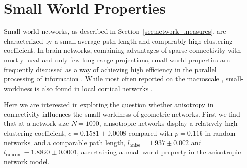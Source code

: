 

\section{Small World Properties}\label{sec:small_world}

Small-world networks, as described in
Section~\ref{sec:network_measures}, are characterized by a small
average path length and comparably high clustering coefficient. In
brain networks, combining advantages of sparse connectivity with
mostly local and only few long-range projections, small-world
properties are frequently discussed as a way of achieving high
efficiency in the parallel processing of
information \parencite[cf.][]{Achard2007}. While most often reported
on the macroscale \parencite{SpornsZwi2004, Bassett2006},
small-worldness is also found in local cortical
networks \parencite[SI]{Perin2011}.

Here we are interested in exploring the question whether
an\-iso\-tropy in connectivity influences the small-worldness of
geometric networks. First we find that at a network size $N=1000$,
anisotropic networks display a relatively high clustering coefficient,
$c = 0.1581 \pm 0.0008$ compared with $p = 0.116$ in random networks,
and a comparable path length, $l_{\mathrm{aniso}} = 1.937 \pm 0.002$
and $l_{\mathrm{random}} = 1.8820 \pm 0.0001$, %
ascertaining a small-world property in the anisotropic network model.

